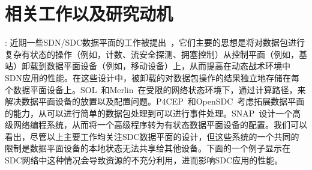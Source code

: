 \documentclass{ctexart}
\newcommand{\para}[1]{\noindent {\bf #1}}%
\begin{document}
\section{相关工作以及研究动机}
\para{相关工作}:
近期一些SDN/SDC数据平面的工作被提出~\cite{arashloo2016snap, heorhiadi2016simplifying, soule2014merlin, benet2018mp, katta2016hula, gember2012stratos, anwer2015programming, monsanto2012compiler, kohler2018p4cep, bianchi2014openstate, opensdc}，它们主要的思想是将对数据包进行复杂有状态的操作（例如，计数、流安全探测、拥塞控制）从控制平面（例如，基站）卸载到数据平面设备（例如，移动设备）上，从而提高在动态战术环境中SDN应用的性能。在这些设计中，被卸载的对数据包操作的结果独立地存储在每个数据平面设备上。SOL~\cite{heorhiadi2016simplifying}和Merlin~\cite{soule2014merlin}在受限的网络状态环境下，通过计算路径，来解决数据平面设备的放置以及配置问题。P4CEP~\cite{kohler2018p4cep}和OpenSDC~\cite{opensdc}考虑拓展数据平面的能力，从可以进行简单的数据包处理到可以进行事件处理。SNAP~\cite{arashloo2016snap}设计一个高级网络编程系统，从而将一个高级程序转为有状态数据平面设备的配置。我们可以看出，尽管以上主要工作均关注SDC数据平面的设计，但这些系统的一个共同的限制是数据平面设备的本地状态无法共享给其他设备。下面的一个例子显示在SDC网络中这种情况会导致资源的不充分利用，进而影响SDC应用的性能。
 
\end{document}
